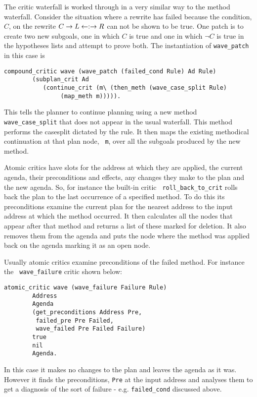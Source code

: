 The critic waterfall is worked through in a
very similar way to the method waterfall.
Consider the situation where a rewrite has failed
because the condition, $C$, on the rewrite $C \rightarrow L \leftarrow:\rightarrow
R$ can not be shown to be true.  One patch is to create two new
subgoals, one in which $C$ is true and one in which $\neg C$ is true
in the hypotheses lists and attempt to prove both.  The instantiation
of {\tt wave\_patch} in this case is
\begin{verbatim}
compound_critic wave (wave_patch (failed_cond Rule) Ad Rule)
        (subplan_crit Ad 
           (continue_crit (m\ (then_meth (wave_case_split Rule) 
                (map_meth m))))).
\end{verbatim}
This tells the planner to continue planning using a new method {\tt
  wave\_case\_split} that does not appear in
the usual waterfall.  This method performs the casesplit dictated by
the rule.  It then maps the existing methodical
continuation at that plan node, {\tt
  m}, over all the subgoals produced by the new method.

Atomic critics have slots for the address at
which they are applied, the current agenda, their preconditions and
effects, any changes they make to the plan and the new agenda.  So,
for instance the built-in critic {\tt
  roll\_back\_to\_crit} rolls back the
plan to the last occurrence of a specified method.  To do this its
preconditions examine the current plan for the nearest address to the
input address at which the method occurred.  It then calculates all the 
nodes that appear after that method and returns a list of these marked 
for deletion.  It also removes them from the agenda and puts the node
where the method was applied back on the agenda marking it as an open
node.

Usually atomic critics examine preconditions of
the failed method.  For instance the {\tt
  wave\_failure} critic shown below:
\begin{verbatim}
atomic_critic wave (wave_failure Failure Rule)
        Address
        Agenda
        (get_preconditions Address Pre, 
         failed_pre Pre Failed,
         wave_failed Pre Failed Failure)
        true
        nil
        Agenda.
\end{verbatim}
In this case it makes no changes to the plan and leaves the
agenda as it was.  However it finds the preconditions,
{\tt Pre} at the input address and analyses them to get a diagnosis of
the sort of failure - e.g. {\tt failed\_cond}
discussed above.

